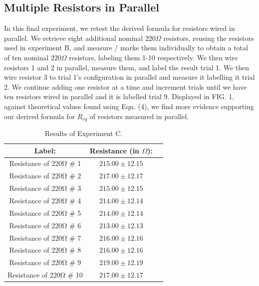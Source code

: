 \documentclass[aps,reprint,floatfix]{revtex4-1}
\newcommand{\forceindent}{\leavevmode{\parindent=1em\indent}}
\begin{document}
\subsection{Multiple Resistors in Parallel}
\forceindent In this final experiment, we retest the derived formula for resistors wired in parallel. We retrieve eight additional nominal $220 \Omega$ resistors, reusing the resistors used in experiment B, and measure / marke them individually to obtain a total of ten nominal $220 \Omega$ resistors, labeling them 1-10 respectively. We then wire resistors 1 and 2 in parallel, measure them, and label the result trial 1. We then wire resistor 3 to trial 1’s configuration in parallel and measure it labelling it trial 2. We continue adding one resistor at a time and increment trials until we have ten resistors wired in parallel and it is labelled trial 9. Displayed in FIG. 1, against theoretical values found using Eqn. (4), we find more evidence supporting our derived formula for $R_{eq}$ of resistors measured in parallel.

\begin{table}[h]
	\begin{tabular}{|c||c|c|}
		\hline		
		Label: 				& Resistance (in $\Omega$):\\ 
		\hline
		\hline
Resistance of 220Ω \# 1	&	$	215.00	\pm	12.15	$	\\	\hline
Resistance of 220Ω \# 2	&	$	217.00	\pm	12.17	$	\\	\hline
Resistance of 220Ω \# 3	&	$	215.00	\pm	12.15	$	\\	\hline
Resistance of 220Ω \# 4	&	$	214.00	\pm	12.14	$	\\	\hline
Resistance of 220Ω \# 5	&	$	214.00	\pm	12.14	$	\\	\hline
Resistance of 220Ω \# 6	&	$	213.00	\pm	12.13	$	\\	\hline
Resistance of 220Ω \# 7	&	$	216.00	\pm	12.16	$	\\	\hline
Resistance of 220Ω \# 8	&	$	216.00	\pm	12.16	$	\\	\hline
Resistance of 220Ω \# 9	&	$	219.00	\pm	12.19	$	\\	\hline
Resistance of 220Ω \# 10&	$	217.00	\pm	12.17	$	\\	\hline
	\end{tabular}
\caption{Results of Experiment C.}
\end{table}
\end{document}
